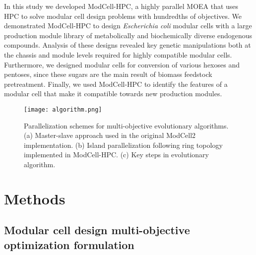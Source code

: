 In this study we developed ModCell-HPC, a highly parallel MOEA that uses HPC to solve modular cell design problems with hundredths of objectives.
We demonstrated ModCell-HPC to design \textit{Escherichia coli} modular cells with a large production module library of metabolically and biochemically diverse endogenous compounds.
Analysis of these designs revealed key genetic manipulations both at the chassis and module levels required for highly compatible modular cells.
Furthermore, we designed modular cells for conversion of various hexoses and pentoses, since these sugars are the main result of biomass feedstock pretreatment.\citep{brodeur2011}
Finally, we used ModCell-HPC to identify the features of a modular cell that make it compatible towards new production modules. %

\begin{figure}[h]
    \centering
    \texttt{[image: algorithm.png]}
    \caption[Parallelization schemes for multi-objective evolutionary algorithms.]{Parallelization schemes for multi-objective evolutionary algorithms. (a) Master-slave approach used in the original ModCell2 implementation. (b) Island parallelization following ring topology implemented in ModCell-HPC. (c) Key steps in evolutionary algorithm.}
    \label{fig7:algorithm}
\end{figure}

\section{Methods}

\subsection{Modular cell design multi-objective optimization formulation} \label{sec:formulation}

